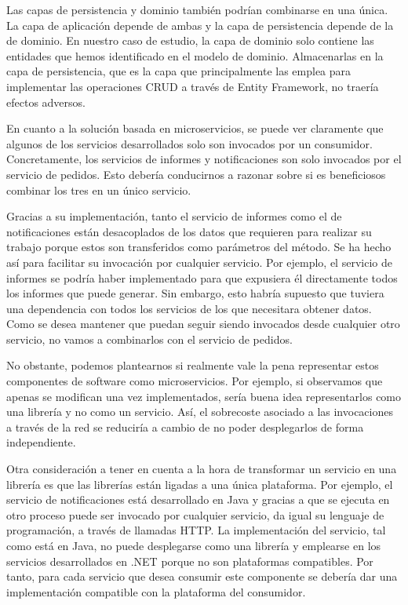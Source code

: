 \documentclass[11pt,spanish,listoffigures]{tfgetsinf}
\begin{document}
Las capas de persistencia y dominio también podrían combinarse en una única. La capa de aplicación depende de ambas y la capa de persistencia depende de la de dominio. En nuestro caso de estudio, la capa de dominio solo contiene las entidades que hemos identificado en el modelo de dominio. Almacenarlas en la capa de persistencia, que es la capa que principalmente las emplea para implementar las operaciones CRUD a través de Entity Framework, no traería efectos adversos.

En cuanto a la solución basada en microservicios, se puede ver claramente que algunos de los servicios desarrollados solo son invocados por un consumidor. Concretamente, los servicios de informes y notificaciones son solo invocados por el servicio de pedidos. Esto debería conducirnos a razonar sobre si es beneficiosos combinar los tres en un único servicio. 

Gracias a su implementación, tanto el servicio de informes como el de notificaciones están desacoplados de los datos que requieren para realizar su trabajo porque estos son transferidos como parámetros del método. Se ha hecho así para facilitar su invocación por cualquier servicio. Por ejemplo, el servicio de informes se podría haber implementado para que expusiera él directamente todos los informes que puede generar. Sin embargo, esto habría supuesto que tuviera una dependencia con todos los servicios de los que necesitara obtener datos. Como se desea mantener que puedan seguir siendo invocados desde cualquier otro servicio, no vamos a combinarlos con el servicio de pedidos.

No obstante, podemos plantearnos si realmente vale la pena representar estos componentes de software como microservicios. Por ejemplo, si observamos que apenas se modifican una vez implementados, sería buena idea representarlos como una librería y no como un servicio. Así, el sobrecoste asociado a las invocaciones a través de la red se reduciría a cambio de no poder desplegarlos de forma independiente.

Otra consideración a tener en cuenta a la hora de transformar un servicio en una librería es que las librerías están ligadas a una única plataforma. Por ejemplo, el servicio de notificaciones está desarrollado en Java y gracias a que se ejecuta en otro proceso puede ser invocado por cualquier servicio, da igual su lenguaje de programación, a través de llamadas HTTP. La implementación del servicio, tal como está en Java, no puede desplegarse como una librería y emplearse en los servicios desarrollados en .NET porque no son plataformas compatibles. Por tanto, para cada servicio que desea consumir este componente se debería dar una implementación compatible con la plataforma del consumidor.
\end{document}
